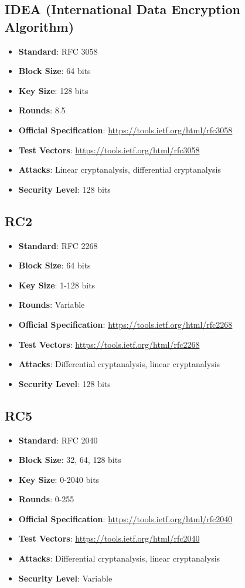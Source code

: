 \documentclass[11pt,a4paper]{article}
\begin{document}
\subsection{IDEA (International Data Encryption Algorithm)}
\begin{itemize}
    \item \textbf{Standard}: RFC 3058
    \item \textbf{Block Size}: 64 bits
    \item \textbf{Key Size}: 128 bits
    \item \textbf{Rounds}: 8.5
    \item \textbf{Official Specification}: \url{https://tools.ietf.org/html/rfc3058}
    \item \textbf{Test Vectors}: \url{https://tools.ietf.org/html/rfc3058}
    \item \textbf{Attacks}: Linear cryptanalysis, differential cryptanalysis
    \item \textbf{Security Level}: 128 bits
\end{itemize}

\subsection{RC2}
\begin{itemize}
    \item \textbf{Standard}: RFC 2268
    \item \textbf{Block Size}: 64 bits
    \item \textbf{Key Size}: 1-128 bits
    \item \textbf{Rounds}: Variable
    \item \textbf{Official Specification}: \url{https://tools.ietf.org/html/rfc2268}
    \item \textbf{Test Vectors}: \url{https://tools.ietf.org/html/rfc2268}
    \item \textbf{Attacks}: Differential cryptanalysis, linear cryptanalysis
    \item \textbf{Security Level}: 128 bits
\end{itemize}

\subsection{RC5}
\begin{itemize}
    \item \textbf{Standard}: RFC 2040
    \item \textbf{Block Size}: 32, 64, 128 bits
    \item \textbf{Key Size}: 0-2040 bits
    \item \textbf{Rounds}: 0-255
    \item \textbf{Official Specification}: \url{https://tools.ietf.org/html/rfc2040}
    \item \textbf{Test Vectors}: \url{https://tools.ietf.org/html/rfc2040}
    \item \textbf{Attacks}: Differential cryptanalysis, linear cryptanalysis
    \item \textbf{Security Level}: Variable
\end{itemize}
\end{document}
